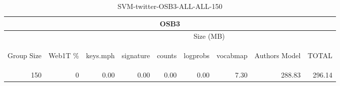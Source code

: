 \begin{center}
\begin{table}[htbp] 
 \begin{center}
\begin{tabular}{ | r | r | r | r | r | r | r | r | r |}
\hline
\multicolumn{9}{|c|}{OSB3}\\
\hline
 & & \multicolumn{7}{|c|}{Size (MB)}\\ \cline{3-9}
\begin{sideways}Group Size\end{sideways} & \begin{sideways}Web1T \% \end{sideways} & \begin{sideways}keys.mph\end{sideways} & \begin{sideways}signature\end{sideways} & \begin{sideways}counts\end{sideways} & \begin{sideways}logprobs\end{sideways} & \begin{sideways}vocabmap\end{sideways} & \begin{sideways}Authors Model \end{sideways} & \begin{sideways}TOTAL\end{sideways}\\
\hline
\multirow{0}{*}{150}
 & 0 & 0.00 & 0.00 & 0.00 & 0.00 & 7.30 & 288.83 & 296.14\\ \cline{2-9}
\hline
\end{tabular}
\caption{SVM-twitter-OSB3-ALL-ALL-150}
\label{table:SVM-twitter-OSB3-ALL-ALL-150}
\end{center}
 \end{table}
\end{center}


